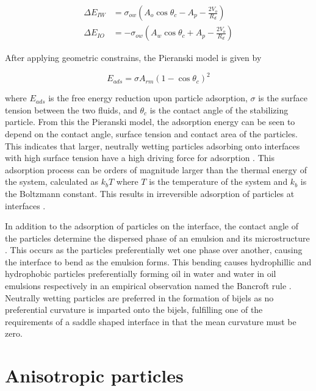 \begin{equation}
    \begin{split}
        \Delta E_{IW} &= \sigma_{ow}(A_o\cos{\theta_c} - A_p - \frac{2 V_o}{R_d}) \\
        \Delta E_{IO} &= -\sigma_{ow}(A_w\cos{\theta_c} + A_p - \frac{2 V_o}{R_d})
    \end{split}
\end{equation}

After applying geometric constrains, the Pieranski model is given by 

\begin{equation}
    E_{ads} = \sigma A_{rm} (1 - \cos{\theta_c})^2
\end{equation}

where $E_{ads}$ is the free energy reduction upon particle adsorption, $\sigma$ is the surface tension between the two fluids, and $\theta_c$ is the contact angle of the stabilizing particle. 
From this the Pieranski model, the adsorption energy can be seen to depend on the contact angle, surface tension and contact area of the particles. This indicates that larger, neutrally wetting
particles adsorbing onto interfaces with high surface tension have a high driving force for adsorption \cite{ngai_particle-stabilized_2015,reeves_particle-size_2015}. This adsorption process 
can be orders of magnitude larger than the thermal energy of the system, calculated as $k_b T$ where $T$ is the temperature of the system and $k_b$ is the Boltzmann constant. This results in 
irreversible adsorption of particles at interfaces \cite{binks_pickering_2001}.

In addition to the adsorption of particles on the interface, the contact angle of the particles determine the dispersed phase of an emulsion and its 
microstructure \cite{velankar_non-equilibrium_2015}.
This occurs as the particles preferentially wet one phase over another, causing the interface to bend as the emulsion forms. This bending causes hydrophillic and hydrophobic particles preferentially 
forming oil in water and water in oil emulsions respectively in an empirical observation named the Bancroft rule \cite{ngai_particle-stabilized_2015}.
Neutrally wetting particles are preferred in the formation of bijels as no preferential curvature is imparted onto the bijels, fulfilling one of the requirements of a saddle shaped interface
in that the mean curvature must be zero. \cite{jinnai_interfacial_2001}

\section{Anisotropic particles}

